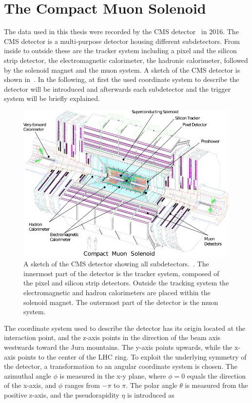 \section{The Compact Muon Solenoid}\label{sec:CMS}
The data used in this thesis were recorded by the CMS detector~\cite{CMS,CMSTDR} in 2016. The CMS detector is a multi-purpose detector housing different subdetectors. From inside to outside these are the tracker system including a pixel and the silicon strip detector, the electromagnetic calorimeter, the hadronic calorimeter, followed by the solenoid magnet and the muon system. A sketch of the CMS detector is shown in~. In the following, at first the used coordinate system to describe the detector will be introduced and afterwards each subdetector and the trigger system will be briefly explained.
\begin{figure}[bp]
 \centering
 \includegraphics[width=0.99\textwidth]{figures/general/cms}
 \caption{A sketch of the CMS detector showing all subdetectors.~\cite{CMSTDR}. The innermost part of the detector is the tracker system, composed of the pixel and silicon strip detectors. Outside the tracking system the electromagnetic and hadron calorimeters are placed within the solenoid magnet. The outermost part of the detector is the muon system.}
 \label{fig:CMS}
\end{figure}
The coordinate system used to describe the detector has its origin located at the interaction point, and the z-axis points in the direction of the beam axis westwards toward the Jura mountains. The y-axis points upwards, while the x-axis points to the center of the LHC ring. To exploit the underlying symmetry of the detector, a transformation to an angular coordinate system is chosen. The azimuthal angle $\phi$ is measured in the x-y plane, where $\phi=0$ equals the direction of the x-axis, and $\phi$ ranges from $-\pi$ to $\pi$. The polar angle $\theta$ is measured from the positive z-axis, and the pseudorapidity $\eta$ is introduced as
